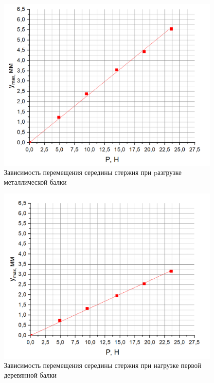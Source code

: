 \documentclass[a4paper,12pt]{article} %
\begin{document}
\newpage
\begin{figure}[h]
\centering
\includegraphics[scale=0.32]{7}
\caption{Зависимость перемещения середины стержня при pазгрузке металлической балки}
\end{figure}
\begin{figure}[!h]
\centering
\includegraphics[scale=0.32]{8}
\caption{Зависимость перемещения середины стержня при нагрузке первой деревянной балки}
\end{figure}
\newpage
\end{document}
